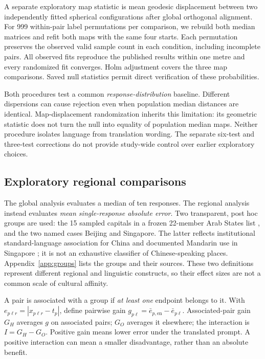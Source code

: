\documentclass[12pt,a4paper]{article}
\begin{document}
A separate exploratory map statistic is mean geodesic displacement between two independently fitted spherical configurations after global orthogonal alignment. For 999 within-pair label permutations per comparison, we rebuild both median matrices and refit both maps with the same four starts. Each permutation preserves the observed valid sample count in each condition, including incomplete pairs. All observed fits reproduce the published results within one metre and every randomized fit converges. Holm adjustment covers the three map comparisons. Saved null statistics permit direct verification of these probabilities.

Both procedures test a common \emph{response-distribution} baseline. Different dispersions can cause rejection even when population median distances are identical. Map-displacement randomization inherits this limitation: its geometric statistic does not turn the null into equality of population median maps. Neither procedure isolates language from translation wording. The separate six-test and three-test corrections do not provide study-wide control over earlier exploratory choices.

\subsection{Exploratory regional comparisons}
The global analysis evaluates a median of ten responses. The regional analysis instead evaluates \emph{mean single-response absolute error}. Two transparent, post hoc groups are used: the 15 sampled capitals in a frozen 22-member Arab States list \cite{arabstates}, and the two named cases Beijing and Singapore. The latter reflects institutional standard-language association for China and documented Mandarin use in Singapore \cite{chinastandard,sgcensus}; it is not an exhaustive classifier of Chinese-speaking places. Appendix~\ref{app:groups} lists the groups and their sources. These two definitions represent different regional and linguistic constructs, so their effect sizes are not a common scale of cultural affinity.

A pair is associated with a group if \emph{at least one} endpoint belongs to it. With $e_{p\ell r}=|x_{p\ell r}-t_p|$, define pairwise gain $g_{p\ell}=\bar e_{p,\mathrm{en}}-\bar e_{p\ell}$. Associated-pair gain $G_H$ averages $g$ on associated pairs; $G_O$ averages it elsewhere; the interaction is $I=G_H-G_O$. Positive gain means lower error under the translated prompt. A positive interaction can mean a smaller disadvantage, rather than an absolute benefit.
\end{document}
